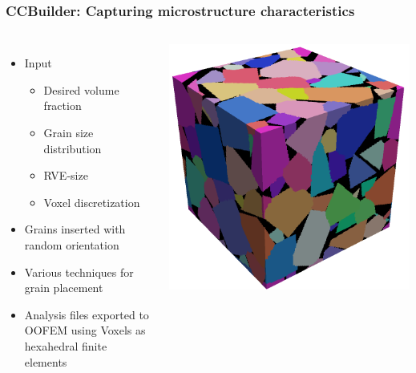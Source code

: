 \documentclass[11pt]{beamer} %
\begin{document}
\begin{frame}
 \frametitle{CCBuilder: Capturing microstructure characteristics}
 \begin{columns}
  \begin{itemize}
  \item Input
   \begin{itemize} 
    \item Desired volume fraction 
    \item Grain size distribution
    \item RVE-size
    \item Voxel discretization
   \end{itemize}
  \item Grains inserted with random orientation
  \item Various techniques for grain placement
  \item Analysis files exported to OOFEM using Voxels as hexahedral finite elements
  \end{itemize}
 \includegraphics[width=1\linewidth]{3D_view_e}
  \end{columns}
\end{frame}
\end{document}
